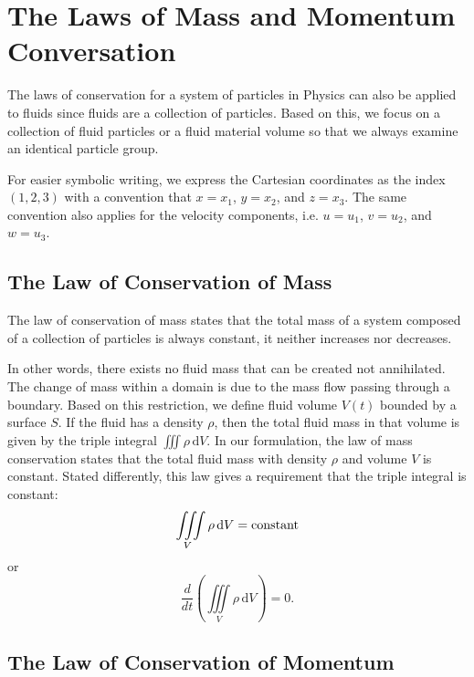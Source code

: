 \documentclass[12pt,a4paper]{report}
\begin{document}
\section{The Laws of Mass and Momentum Conversation}

The laws of conservation for a system of particles in Physics can also be applied to fluids since fluids are a collection of particles.
Based on this, we focus on a collection of fluid particles or a fluid material volume so that we always examine an identical particle group.

For easier symbolic writing, we express the Cartesian coordinates as the index $(1,2,3)$ with a convention that $x = x_{1}$, $y = x_{2}$, and $z = x_{3}$.
The same convention also applies for the velocity components, i.e. $u = u_1$, $v = u_2$, and $w = u_3$.

\subsection{The Law of Conservation of Mass}

The law of conservation of mass states that the total mass of a system composed of a collection of particles is always constant, it neither increases nor decreases.

In other words, there exists no fluid mass that can be created not annihilated.
The change of mass within a domain is due to the mass flow passing through a boundary.
Based on this restriction, we define fluid volume $V(t)$ bounded by a surface $S$.
If the fluid has a density $\rho$, then the total fluid mass in that volume is given by the triple integral
$\iiint \rho \, \mathrm{d}V$. In our formulation, the law of mass conservation states that the total fluid mass with density $\rho$ and volume $V$ is constant.
Stated differently, this law gives a requirement that the triple integral is constant:
\begin{equation}
\iiint\limits_{V} \rho \, \mathrm{d}V = \textmd{constant}
\end{equation}
or
\begin{equation}
\frac{d}{dt} \left(\iiint\limits_{V} \rho \, \mathrm{d}V \right) = 0. \label{ms}
\end{equation}

\subsection{The Law of Conservation of Momentum}
\end{document}
